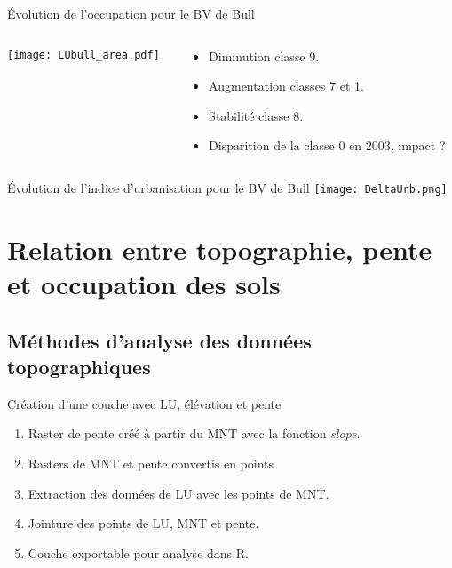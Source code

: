 \documentclass[aspectratio=169]{beamer}
\begin{document}
\begin{frame}{Évolution de l\rq{}occupation pour le BV de Bull}
\begin{columns}
	\begin{column}{0.77\textwidth}
		 \texttt{[image: LUbull\_area.pdf]}
	\end{column}
	\begin{column}{0.23\textwidth}
		 \begin{itemize}
		\item Diminution classe 9.
		\item Augmentation classes 7 et 1.
		\item Stabilité classe 8.
		\item Disparition de la classe 0 en 2003, impact ?
		\end{itemize}
	\end{column}
\end{columns}
\end{frame}

\begin{frame}{Évolution de l\rq{}indice d\rq{}urbanisation pour le BV de Bull}
\texttt{[image: DeltaUrb.png]}
\end{frame}


\section{Relation entre topographie, pente et occupation des sols}

\subsection{Méthodes d\rq{}analyse des données topographiques}

\begin{frame}{Création d\rq{}une couche avec LU, élévation et pente}
	\begin{enumerate}
	\setlength{\itemsep}{10pt}
	\item Raster de pente créé à partir du MNT avec la fonction \emph{slope}.
	\item Rasters de MNT et pente convertis en points.
	\item Extraction des données de LU avec les points de MNT.
	\item Jointure des points de LU, MNT et pente.
	\item Couche exportable pour analyse dans R.
	\end{enumerate}
\end{frame}
\end{document}
